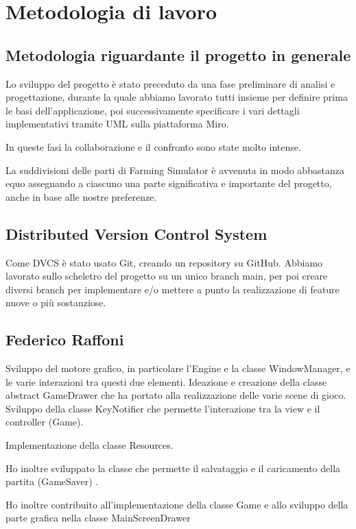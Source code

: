 \documentclass[a4paper,12pt]{report}
\begin{document}
\section{Metodologia di lavoro}

\subsection*{Metodologia riguardante il progetto in generale}
Lo sviluppo del progetto è stato preceduto da una fase preliminare di analisi e progettazione, durante la quale abbiamo lavorato tutti insieme per definire prima le basi dell'applicazione, poi successivamente specificare i vari dettagli implementativi tramite UML sulla piattaforma Miro.

In queste fasi la collaborazione e il confronto sono state molto intense.

La suddivisioni delle parti di Farming Simulator  è avvenuta in modo abbastanza equo assegnando a ciascuno una parte significativa e importante del progetto, anche in base alle nostre preferenze. 


\subsection*{Distributed Version Control System}
Come DVCS è stato usato Git, creando un repository su GitHub. Abbiamo lavorato sullo scheletro del progetto su un unico branch main, per poi creare diversi branch per implementare e/o mettere a punto la realizzazione di feature nuove o più sostanziose.

\subsection{Federico Raffoni}
Sviluppo del motore grafico, in particolare l’Engine e la classe WindowManager, e le varie interazioni tra questi due elementi. Ideazione e creazione della classe abstract GameDrawer che ha portato alla realizzazione delle varie scene di gioco.  Sviluppo della classe KeyNotifier che permette l’interazione tra la view e il controller (Game).

 Implementazione della classe Resources. 
 
 Ho inoltre sviluppato la classe che permette il salvataggio e il caricamento della partita (GameSaver) .

\hfill\break
Ho inoltre contribuito all'implementazione della classe Game  e  allo sviluppo della parte grafica nella classe MainScreenDrawer 
\end{document}
